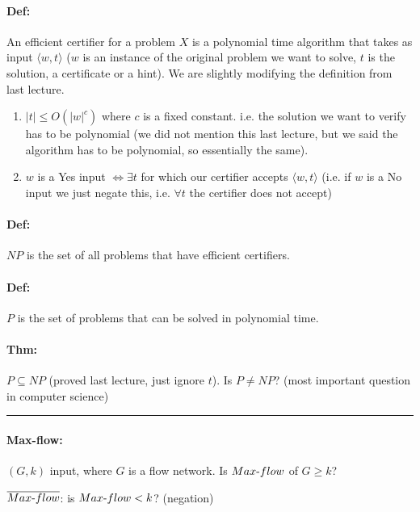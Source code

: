 \documentclass[12 pt]{article}
\begin{document}
          \paragraph{Def:} An efficient certifier for a problem $X$ is
          a polynomial time algorithm that takes as input $\langle w,
          t \rangle$ ($w$ is an instance of the original problem we
          want to solve, $t$ is the solution, a certificate or a
          hint). We are slightly modifying the definition from last lecture.
          \begin{enumerate}
          \item $\left|t\right| \leq O (\left|w\right|^c)$ where $c$
            is a fixed constant. i.e. the solution we want to verify
            has to be polynomial (we did not mention this last
            lecture, but we said the algorithm has to be polynomial,
            so essentially the same).
          \item $w$ is a Yes input $\iff \exists t $ for which our
            certifier accepts $\langle w, t \rangle$ (i.e. if $w$ is a
            No input we just negate this, i.e. $\forall t$ the
            certifier does not accept)
          \end{enumerate}
          \paragraph{Def:} $NP$ is the set of all problems that have
          efficient certifiers.
          \paragraph{Def:} $P$ is the set of problems that can be
          solved in polynomial time.
          \paragraph{Thm:} $P \subseteq NP$ (proved last lecture, just
          ignore $t$). Is $P \neq NP$? (most important question in
          computer science)
          \\ \noindent \rule{\textwidth}{0.5pt}
          \paragraph{Max-flow:} $(G,k)$ input, where $G$ is a flow
          network. Is $Max\hbox{-}flow$ of $G \geq k$?

          $\overline{Max\hbox{-}flow}$: is $Max\hbox{-}flow < k$? (negation)
\end{document}
